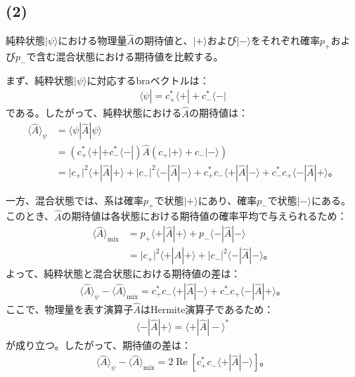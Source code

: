 \documentclass[platex,dvipdfmx,a4paper]{jsarticle}
\begin{document}
\subsection*{(2)}

純粋状態$\lvert\psi\rangle$における物理量$\hat{A}$の期待値と、$\lvert+\rangle$および$\lvert-\rangle$をそれぞれ確率$p_+$および$p_-$で含む混合状態における期待値を比較する。

まず、純粋状態$\lvert\psi\rangle$に対応するbraベクトルは：
\begin{align*}
  \langle\psi|
  =c_+^*\langle+|+c_-^*\langle-|
\end{align*}
である。したがって、純粋状態における$\hat{A}$の期待値は：
\begin{align*}
  \langle\hat{A}\rangle_\psi
  &=\langle\psi|\hat{A}|\psi\rangle \\
  &=
  \left(c_+^*\langle+|+c_-^*\langle-|\right)
  \hat{A}
  \left(c_+\lvert+\rangle+c_-\lvert-\rangle\right) \\
  &=\lvert c_+\rvert^2\langle+|\hat{A}|+\rangle
    +\lvert c_-\rvert^2\langle-|\hat{A}|-\rangle
    +c_+^*c_-\langle+|\hat{A}|-\rangle
    +c_-^*c_+\langle-|\hat{A}|+\rangle。
\end{align*}

一方、混合状態では、系は確率$p_+$で状態$\lvert+\rangle$にあり、確率$p_-$で状態$\lvert-\rangle$にある。このとき、$\hat{A}$の期待値は各状態における期待値の確率平均で与えられるため：
\begin{align*}
  \langle\hat{A}\rangle_{\mathrm{mix}}
  &=p_+\langle+|\hat{A}|+\rangle
    +p_-\langle-|\hat{A}|-\rangle \\
  &=\lvert c_+\rvert^2\langle+|\hat{A}|+\rangle
    +\lvert c_-\rvert^2\langle-|\hat{A}|-\rangle。
\end{align*}
よって、純粋状態と混合状態における期待値の差は：
\begin{align*}
  \langle\hat{A}\rangle_\psi-\langle\hat{A}\rangle_{\mathrm{mix}}
  =c_+^*c_-\langle+|\hat{A}|-\rangle
   +c_-^*c_+\langle-|\hat{A}|+\rangle。
\end{align*}
ここで、物理量を表す演算子$\hat{A}$はHermite演算子であるため：
\begin{align*}
  \langle-|\hat{A}|+\rangle
  =\langle+|\hat{A}|-\rangle^*
\end{align*}
が成り立つ。したがって、期待値の差は：
\begin{align*}
  \langle\hat{A}\rangle_\psi-\langle\hat{A}\rangle_{\mathrm{mix}}
  =2\operatorname{Re}
  \left[
    c_+^*c_-\langle+|\hat{A}|-\rangle
  \right]。
\end{align*}
\end{document}
